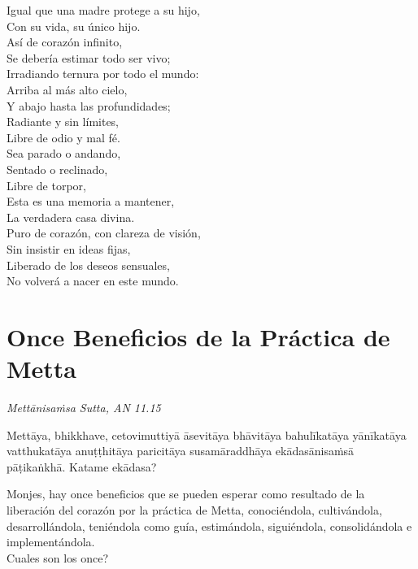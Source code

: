 Igual que una madre protege a su hijo,\\
Con su vida, su único hijo.\\
Así de corazón infinito,\\
Se debería estimar todo ser vivo;\\
Irradiando ternura por todo el mundo:\\
Arriba al más alto cielo,\\
Y abajo hasta las profundidades;\\
Radiante y sin límites,\\
Libre de odio y mal fé.\\
Sea parado o andando,\\
Sentado o reclinado,\\
Libre de torpor,\\
Esta es una memoria a mantener,\\
La verdadera casa divina.\\

Puro de corazón, con clareza de visión,\\
Sin insistir en ideas fijas,\\
Liberado de los deseos sensuales,\\
No volverá a nacer en este mundo.

\chapter[Once Beneficios]{Once Beneficios de la Práctica de Metta}

\emph{Mettānisaṁsa Sutta, AN 11.15}


\begin{leader}
\end{leader}

Mettāya, bhikkhave, cetovimuttiyā āsevitāya bhāvitāya bahulīkatāya yānīkatāya vatthukatāya anuṭṭhitāya paricitāya susamāraddhāya ekādasānisaṁsā pāṭikaṅkhā. Katame ekādasa?

\begin{english}
  Monjes, hay once beneficios que se pueden esperar como resultado de la liberación del corazón por la práctica de Metta, conociéndola, cultivándola, desarrollándola, teniéndola como guía, estimándola, siguiéndola, consolidándola e implementándola.\\
  Cuales son los once?
\end{english}

